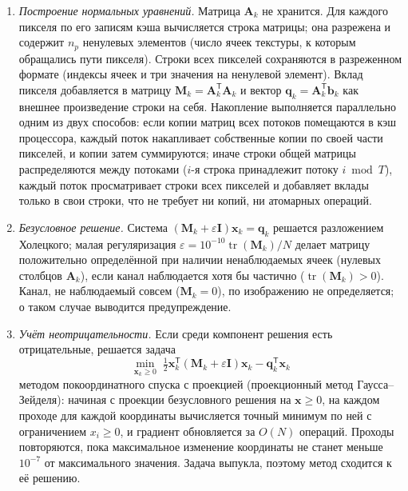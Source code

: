 \begin{enumerate}
    \item \emph{Построение нормальных уравнений.} Матрица $\mathbf{A}_k$ не хранится. Для каждого пикселя по его записям кэша вычисляется строка матрицы; она разрежена и содержит $n_p$ ненулевых элементов (число ячеек текстуры, к которым обращались пути пикселя). Строки всех пикселей сохраняются в разреженном формате (индексы ячеек и три значения на ненулевой элемент). Вклад пикселя добавляется в матрицу $\mathbf{M}_k=\mathbf{A}_k^\mathsf{T}\mathbf{A}_k$ и вектор $\mathbf{q}_k=\mathbf{A}_k^\mathsf{T}\mathbf{b}_k$ как внешнее произведение строки на себя. Накопление выполняется параллельно одним из двух способов: если копии матриц всех потоков помещаются в кэш процессора, каждый поток накапливает собственные копии по своей части пикселей, и копии затем суммируются; иначе строки общей матрицы распределяются между потоками ($i$-я строка принадлежит потоку $i \bmod T$), каждый поток просматривает строки всех пикселей и добавляет вклады только в свои строки, что не требует ни копий, ни атомарных операций.
    \item \emph{Безусловное решение.} Система $(\mathbf{M}_k+\varepsilon\mathbf{I})\mathbf{x}_k=\mathbf{q}_k$ решается разложением Холецкого; малая регуляризация $\varepsilon=10^{-10}\operatorname{tr}(\mathbf{M}_k)/N$ делает матрицу положительно определённой при наличии ненаблюдаемых ячеек (нулевых столбцов $\mathbf{A}_k$), если канал наблюдается хотя бы частично ($\operatorname{tr}(\mathbf{M}_k)>0$). Канал, не наблюдаемый совсем ($\mathbf{M}_k=0$), по изображению не определяется; о таком случае выводится предупреждение.
    \item \emph{Учёт неотрицательности.} Если среди компонент решения есть отрицательные, решается задача
    \begin{equation}
    \min_{\mathbf{x}_k\geq 0}\;
    \tfrac12\mathbf{x}_k^\mathsf{T}(\mathbf{M}_k+\varepsilon\mathbf{I})\mathbf{x}_k-\mathbf{q}_k^\mathsf{T}\mathbf{x}_k
    \end{equation}
    методом покоординатного спуска с проекцией (проекционный метод Гаусса--Зейделя): начиная с проекции безусловного решения на $\mathbf{x}\geq 0$, на каждом проходе для каждой координаты вычисляется точный минимум по ней с ограничением $x_i\geq 0$, и градиент обновляется за $O(N)$ операций. Проходы повторяются, пока максимальное изменение координаты не станет меньше $10^{-7}$ от максимального значения. Задача выпукла, поэтому метод сходится к её решению.
\end{enumerate}

